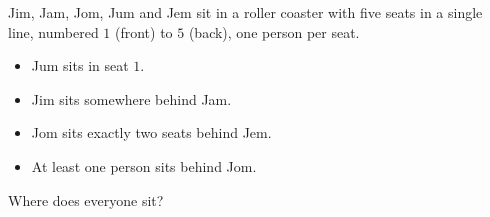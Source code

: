 Jim, Jam, Jom, Jum and Jem sit in a roller coaster with five seats in a single line, numbered $1$ (front) to $5$ (back), one person per seat.
\begin{itemize}
\item Jum sits in seat $1$.
\item Jim sits somewhere behind Jam.
\item Jom sits exactly two seats behind Jem.
\item At least one person sits behind Jom.
\end{itemize}
Where does everyone sit?
